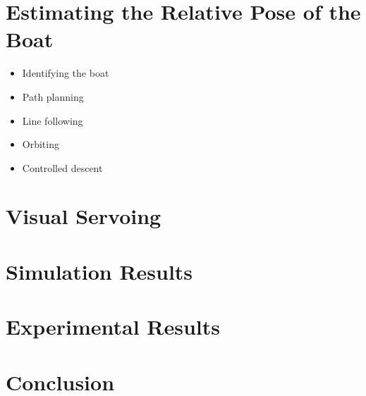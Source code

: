 \documentclass{article}
\begin{document}
\section{Estimating the Relative Pose of the Boat}

\begin{itemize}
\item Identifying the boat
\item Path planning
\item Line following
\item Orbiting
\item Controlled descent 
\end{itemize}



\section{Visual Servoing}

\section{Simulation Results}

\section{Experimental Results}

\section{Conclusion}
\label{sec:conclusion}




\end{document}

